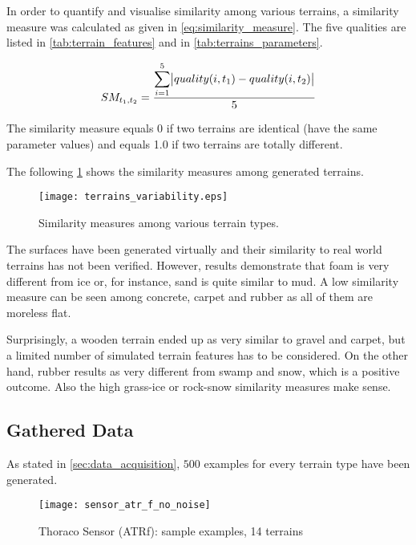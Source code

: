 In order to quantify and visualise similarity among various terrains, a similarity measure was calculated as given in \cref{eq:similarity_measure}. The five qualities are listed in \cref{tab:terrain_features} and in \cref{tab:terrains_parameters}.

\begin{align} \label{eq:similarity_measure}
  SM_{t_1, t_2} = \frac{\displaystyle\sum_{i=1}^{5} \abs{quality(i, t_1) - quality(i, t_2)}}{5}
\end{align} 

The similarity measure equals 0 if two terrains are identical (have the same parameter values) and equals 1.0 if two terrains are totally different.

The following \cref{fig:terrain_similarity_measures} shows the similarity measures among generated terrains.

\begin{figure}[H]
  \centering
  \texttt{[image: terrains\_variability.eps]}
  \caption{Similarity measures among various terrain types.}
  \label{fig:terrain_similarity_measures}
\end{figure}

The surfaces have been generated virtually and their similarity to real world terrains has not been verified. However, results demonstrate that foam is very different from ice or, for instance, sand is quite similar to mud. A low similarity measure can be seen among concrete, carpet and rubber as all of them are moreless flat.

Surprisingly, a wooden terrain ended up as very similar to gravel and carpet, but a limited number of simulated terrain features has to be considered. 
On the other hand, rubber results as very different from swamp and snow, which is a positive outcome. Also the high grass-ice or rock-snow similarity measures make sense. 

\subsection{Gathered Data} \label{ssec:gathered_data}
As stated in \cref{sec:data_acquisition}, $ 500 $ examples for every terrain type have been generated.

\begin{figure}[H]
  \centering
  \texttt{[image: sensor\_atr\_f\_no\_noise]}
  \caption{Thoraco Sensor (ATRf): sample examples, 14 terrains}
  \label{fig:sensor_atr_f_no_noise}
\end{figure}

